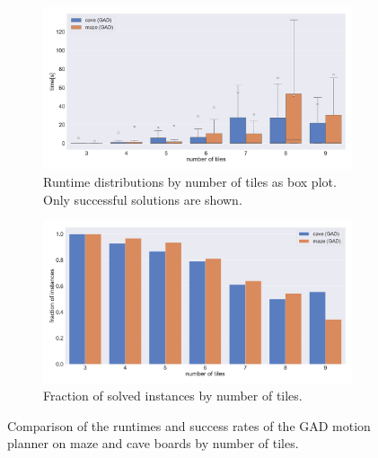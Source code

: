 \begin{figure}[htpb]
\begin{subfigure}[b]{\textwidth}
\centering
\includegraphics[width=\textwidth]{figures/plots/heuristic_solvers_i1/gad_i1_maze_vs_cave_time.pdf}
\caption{Runtime distributions by number of tiles as box plot. Only successful solutions are shown.}
\label{fig:i1_gad_maze_cave_time}
\end{subfigure}
\begin{subfigure}[b]{\textwidth}
\centering
\includegraphics[width=\textwidth]{figures/plots/heuristic_solvers_i1/gad_i1_maze_vs_cave_fraction_solved.pdf}
\caption{Fraction of solved instances by number of tiles.}
\label{fig:i1_gad_maze_cave_fraction_solved}
\end{subfigure}
\caption[Runtime and success rate of GAD on maze and cave boards]{Comparison of the runtimes and success rates of the GAD motion planner on maze and cave boards by number of tiles.}
\label{fig:i1_gad_maze_cave}
\end{figure}

